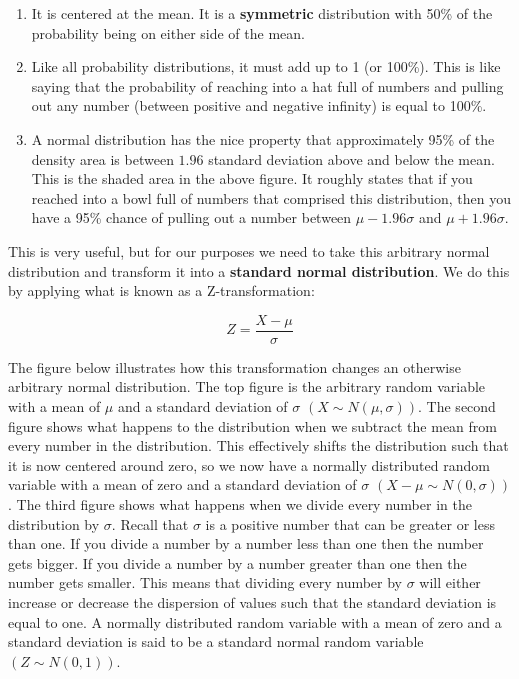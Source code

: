 \documentclass[
]{book}
\begin{document}
\begin{enumerate}
\def\labelenumi{\arabic{enumi}.}
\item
  It is centered at the mean. It is a \textbf{symmetric} distribution with 50\% of the probability being on either side of the mean.
\item
  Like all probability distributions, it must add up to 1 (or 100\%). This is like saying that the probability of reaching into a hat full of numbers and pulling out any number (between positive and negative infinity) is equal to 100\%.
\item
  A normal distribution has the nice property that approximately 95\% of the density area is between \(1.96\) standard deviation above and below the mean. This is the shaded area in the above figure. It roughly states that if you reached into a bowl full of numbers that comprised this distribution, then you have a 95\% chance of pulling out a number between \(\mu-1.96\sigma\) and \(\mu+1.96\sigma\).
\end{enumerate}

This is very useful, but for our purposes we need to take this arbitrary normal distribution and transform it into a \textbf{standard normal distribution}. We do this by applying what is known as a Z-transformation:

\[Z=\frac{X-\mu}{\sigma}\]

The figure below illustrates how this transformation changes an otherwise arbitrary normal distribution. The top figure is the arbitrary random variable with a mean of \(\mu\) and a standard deviation of \(\sigma\) \((X \sim N(\mu,\sigma))\). The second figure shows what happens to the distribution when we subtract the mean from every number in the distribution. This effectively shifts the distribution such that it is now centered around zero, so we now have a normally distributed random variable with a mean of zero and a standard deviation of \(\sigma\) \((X-\mu \sim N(0,\sigma))\). The third figure shows what happens when we divide every number in the distribution by \(\sigma\). Recall that \(\sigma\) is a positive number that can be greater or less than one. If you divide a number by a number less than one then the number gets bigger. If you divide a number by a number greater than one then the number gets smaller. This means that dividing every number by \(\sigma\) will either increase or decrease the dispersion of values such that the standard deviation is equal to one. A normally distributed random variable with a mean of zero and a standard deviation is said to be a standard normal random variable \((Z \sim N(0,1))\).
\end{document}
